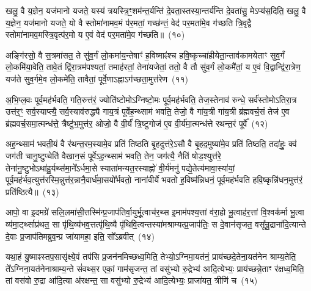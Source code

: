 खलु॒ वै य॒ज्ञेन॒ यज॑मानो यजते॒ यस्य॑ त्रयस्त्रि॒ꣳ॒शम॑न्त॒र्यन्ति॑ दे॒वता॒स्तस्या॒न्तर्य॑न्ति दे॒वता॑सु॒ मे\-ऽप्य॑स॒दिति॒ खलु॒ वै य॒ज्ञेन॒ यज॑मानो यजते॒ यो वै स्तोमा॑नामव॒मं प॑र॒मतां॒ गच्छ॑न्तं॒ वेद॑ पर॒मता॑मे॒व ग॑च्छति त्रि॒वृद्वै स्तोमा॑नामव॒म\-स्त्रि॒वृत्प॑र॒मो य ए॒वं वेद॑ पर॒मता॑मे॒व ग॑च्छति॥~(१०)

{\anuvakamend[{स॒प्त॒द॒शम॑न्त॒र्यन्ति॑ वि॒राजीति॒ चतु॑श्चत्वारिꣳशच्च}]}%

अङ्गि॑रसो॒ वै स॒त्रमा॑सत॒ ते सु॑व॒र्गं लो॒कमा॑य॒न्तेषाꣳ॑ ह॒विष्माꣴ॑श्च हवि॒ष्कृच्चा॑हीयेता॒न्ताव॑कामयेताꣳ सुव॒र्गं लो॒कमि॑या॒वेति॒ तावे॒तं द्वि॑रा॒त्रम॑पश्यतां॒ तमाह॑रतां॒ तेना॑यजेतां॒ ततो॒ वै तौ सु॑व॒र्गं लो॒कमै॑तां॒ य ए॒वं वि॒द्वान्द्वि॑रा॒त्रेण॒ यज॑ते सुव॒र्गमे॒व लो॒कमे॑ति॒ तावैतां॒ पूर्वे॒णा\-ऽह्ना\-ऽग॑च्छता॒मुत्त॑रेण~(११)

अ॒भि॒प्ल॒वः पूर्व॒मह॑र्भवति॒ गति॒रुत्त॑रं॒ ज्योति॑ष्टोमो\-ऽग्निष्टो॒मः पूर्व॒मह॑र्भवति॒ तेज॒स्तेनाव॑ रुन्धे॒ सर्व॑स्तोमो\-ऽतिरा॒त्र उत्त॑र॒ꣳ॒ सर्व॒स्याप्त्यै॒ सर्व॒स्याव॑रुद्ध्यै गाय॒त्रं पूर्वेह॒न्थ्साम॑ भवति॒ तेजो॒ वै गा॑य॒त्री गा॑य॒त्री ब्र॑ह्मवर्च॒सं तेज॑ ए॒व ब्र॑ह्मवर्च॒स\-मा॒त्मन्ध॑त्ते॒ त्रैष्टु॑भ॒मुत्त॑र॒ ओजो॒ वै वी॒र्यं॑ त्रि॒ष्टुगोज॑ ए॒व वी॒र्य॑मा॒त्मन्ध॑त्ते रथन्त॒रं पूर्वे᳚~(१२)

अह॒न्थ्साम॑ भवती॒यं वै र॑थन्त॒रम॒स्यामे॒व प्रति॑ तिष्ठति बृ॒हदुत्त॑रे॒\-ऽसौ वै बृ॒हद॒मुष्या॑मे॒व प्रति॑ तिष्ठति॒ तदा॑हुः॒ क्व॑ जग॑ती चानु॒ष्टुप्चेति॑ वैखान॒सं पूर्वे\-ऽह॒न्थ्साम॑ भवति॒ तेन॒ जग॑त्यै॒ नैति॑ षोड॒श्युत्त॑रे॒ तेना॑नु॒ष्टुभो\-ऽथा॑हु॒र्यथ्स॑मा॒ने᳚\-ऽर्धमा॒से स्याता॑मन्यत॒रस्याह्नो॑ वी॒र्य॑मनु॑ पद्ये॒तेत्य॑मावा॒स्या॑यां॒ पूर्व॒मह॑र्भव॒त्युत्त॑रस्मि॒न्नुत्त॑र॒न्नानै॒वार्ध॑मा॒सयो᳚र्भवतो॒ नाना॑वीर्ये भवतो ह॒विष्म॑न्निधनं॒ पूर्व॒मह॑र्भवति हवि॒ष्कृन्नि॑धन॒मुत्त॑रं॒ प्रति॑ष्ठित्यै॥~(१३)

{}%

आपो॒ वा इ॒दमग्रे॑ सलि॒लमा॑सी॒त्तस्मि॑न्प्र॒जा\-प॑तिर्वा॒युर्भू॒त्वाच॑र॒थ्स इ॒माम॑पश्य॒त्तां व॑रा॒हो भू॒त्वाह॑र॒त्तां वि॒श्वक॑र्मा भू॒त्वा व्य॑मा॒र्ट्थ्साप्र॑थत॒ सा पृ॑थि॒व्य॑भव॒त्तत्पृ॑थि॒व्यै पृ॑थिवि॒त्वन्तस्या॑मश्राम्यत्प्र॒जा\-प॑तिः॒ स दे॒वान॑सृजत॒ वसू᳚न्रु॒द्राना॑दि॒त्यान्ते दे॒वाः प्र॒जा\-प॑तिमब्रुव॒न्प्र जा॑यामहा॒ इति॒ सो᳚\-ऽब्रवीत्~(१४)

यथा॒हं यु॒ष्माꣴस्तप॒सासृ॑क्ष्ये॒वं तप॑सि प्र॒जन॑नमिच्छध्व॒मिति॒ तेभ्यो॒\-ऽग्निमा॒यत॑नं॒ प्राय॑च्छदे॒तेना॒यत॑नेन श्राम्य॒तेति॒ ते᳚\-ऽग्निना॒यत॑नेनाश्राम्य॒न्ते सं॑वथ्स॒र एकां॒ गाम॑सृजन्त॒ तां वसु॑भ्यो रु॒द्रेभ्य॑ आदि॒त्येभ्यः॒ प्राय॑च्छन्ने॒ताꣳ र॑क्षध्व॒मिति॒ तां वस॑वो रु॒द्रा आ॑दि॒त्या अ॑रक्षन्त॒ सा वसु॑भ्यो रु॒द्रेभ्य॑ आदि॒त्येभ्यः॒ प्राजा॑यत॒ त्रीणि॑ च~(१५)

